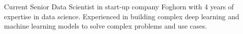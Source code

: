 

\begin{cvparagraph}

Current Senior Data Scientist in start-up company Foghorn with 4 years of expertise in data science. Experienced in building complex deep learning and machine learning models to 
solve complex problems and use cases.
\end{cvparagraph}
